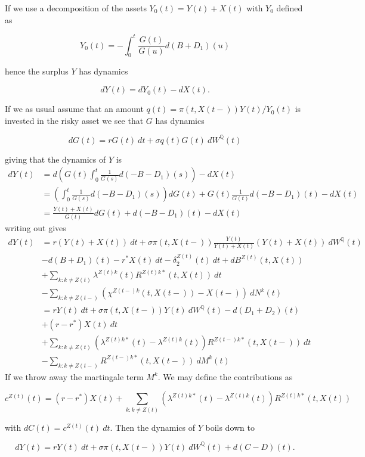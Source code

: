 \documentclass[a4paper,12pt,openany]{book}
\begin{document}
If we use a decomposition of the assets \(Y_0(t)=Y(t)+X(t)\) with \(Y_0\) defined as

\[
Y_0(t)=-\int_0^t\frac{G(t)}{G(u)}d(B+D_1)(u)
\]

hence the surplus \(Y\) has dynamics

\[
dY(t)=dY_0(t)-dX(t).
\]

If we as usual assume that an amount \(q(t)=\pi(t,X(t-))Y(t)/Y_0(t)\) is invested in the risky asset we see that \(G\) has dynamics

\[
dG(t)=rG(t)\ dt + \sigma q(t) G(t)\ dW^{\mathbb Q}(t)
\]

giving that the dynamics of \(Y\) is
\begin{align*}
dY(t)&=d\left(G(t)\int_0^t\frac{1}{G(s)}d(-B-D_1)(s)\right)-dX(t)\\
&=\left(\int_0^t\frac{1}{G(s)}d(-B-D_1)(s)\right)dG(t)+G(t)\frac{1}{G(t)}d(-B-D_1)(t)-dX(t)\\
&=\frac{Y(t)+X(t)}{G(t)}dG(t)+d(-B-D_1)(t)-dX(t)
\end{align*}
writing out gives
\begin{align*}
dY(t)&=r(Y(t)+X(t))\ dt + \sigma \pi(t,X(t-))\frac{Y(t)}{Y(t)+X(t)} (Y(t)+X(t))\ dW^{\mathbb Q}(t)\\
&-d(B+D_1)(t)-r^*X(t)\ dt-\delta_2^{Z(t)}(t)\ dt+dB^{Z(t)}(t,X(t))\\
&+\sum_{k:k\ne Z(t)}\lambda^{Z(t)k}(t)R^{Z(t)k*}(t,X(t))\ dt\\
&-\sum_{k:k\ne Z(t-)}\left(\chi^{Z(t-)k}(t,X(t-))-X(t-)\right)\ dN^k(t)\\
&=rY(t)\ dt+\sigma \pi(t,X(t-))Y(t)\ dW^{\mathbb Q}(t)-d(D_1+D_2)(t)\\
&+(r-r^*)X(t)\ dt\\
&+\sum_{k:k\ne Z(t)}\left(\lambda^{Z(t)k*}(t)-\lambda^{Z(t)k}(t)\right)R^{Z(t-)k*}(t,X(t-))\ dt\\
&-\sum_{k:k\ne Z(t-)}R^{Z(t-)k*}(t,X(t-))\ dM^k(t)
\end{align*}
If we throw away the martingale term \(M^k\). We may define the contributions as

\[
c^{Z(t)}(t)=(r-r^*)X(t) +\sum_{k:k\ne Z(t)}\left(\lambda^{Z(t)k*}(t)-\lambda^{Z(t)k}(t)\right)R^{Z(t)k*}(t,X(t))
\]

with \(dC(t)=c^{Z(t)}(t)\ dt\). Then the dynamics of \(Y\) boils down to

\[
dY(t)=rY(t)\ dt+\sigma \pi(t,X(t-))Y(t)\ dW^{\mathbb Q}(t)+d(C-D)(t).
\]
\end{document}
